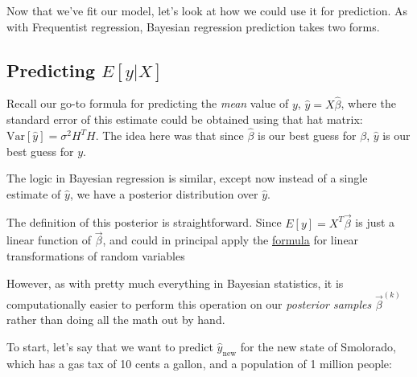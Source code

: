 \documentclass[
]{article}
\newenvironment{Shaded}{\begin{snugshade}}{\end{snugshade}}
\newcommand{\CommentTok}[1]{\textcolor[rgb]{0.56,0.35,0.01}{\textit{#1}}}
\newcommand{\DecValTok}[1]{\textcolor[rgb]{0.00,0.00,0.81}{#1}}
\newcommand{\FunctionTok}[1]{\textcolor[rgb]{0.00,0.00,0.00}{#1}}
\newcommand{\NormalTok}[1]{#1}
\newcommand{\OtherTok}[1]{\textcolor[rgb]{0.56,0.35,0.01}{#1}}
\newcommand{\SpecialCharTok}[1]{\textcolor[rgb]{0.00,0.00,0.00}{#1}}
\begin{document}
Now that we've fit our model, let's look at how we could use it for
prediction. As with Frequentist regression, Bayesian regression
prediction takes two forms.

\hypertarget{predicting-eyx}{%
\subsection{\texorpdfstring{Predicting
\(E[y|X]\)}{Predicting E{[}y\textbar X{]}}}\label{predicting-eyx}}

Recall our go-to formula for predicting the \emph{mean} value of \(y\),
\(\hat y = X \hat \beta\), where the standard error of this estimate
could be obtained using that hat matrix:
\(\text{Var}[\hat y] = \sigma^2 H^T H\). The idea here was that since
\(\hat \beta\) is our best guess for \(\beta\), \(\hat y\) is our best
guess for \(y\).

The logic in Bayesian regression is similar, except now instead of a
single estimate of \(\hat y\), we have a posterior distribution over
\(\hat y\).

The definition of this posterior is straightforward. Since
\(E[y] = X^T \vec \beta\) is just a linear function of \(\vec \beta\),
and could in principal apply the
\href{https://en.wikipedia.org/wiki/Probability_density_function\#Vector_to_vector}{formula}
for linear transformations of random variables

However, as with pretty much everything in Bayesian statistics, it is
computationally easier to perform this operation on our \emph{posterior
samples} \(\vec \beta ^{(k)}\) rather than doing all the math out by
hand.

To start, let's say that we want to predict \(\hat y_{\text{new}}\) for
the new state of Smolorado, which has a gas tax of 10 cents a gallon,
and a population of 1 million people:

\begin{Shaded}
\end{Shaded}
\end{document}
